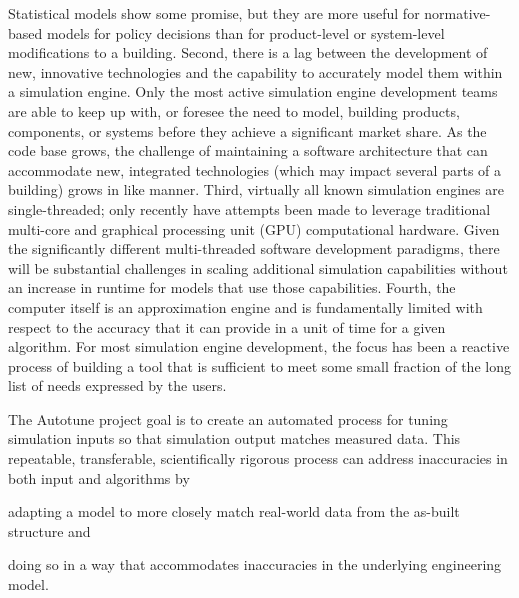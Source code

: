 \documentclass[preprint, review, 12pt]{elsarticle}
\begin{document}
Statistical models show some promise, but they are more useful for normative-based models for policy decisions than for product-level or system-level modifications to a building. Second, there is a lag between the development of new, innovative technologies and the capability to accurately model them within a simulation engine. Only the most active simulation engine development teams are able to keep up with, or foresee the need to model, building products, components, or systems before they achieve a significant market share. As the code base grows, the challenge of maintaining a software architecture that can accommodate new, integrated technologies (which may impact several parts of a building) grows in like manner. Third, virtually all known simulation engines are single-threaded; only recently have attempts been made to leverage traditional multi-core and graphical processing unit (GPU) computational hardware. Given the significantly different multi-threaded software development paradigms, there will be substantial challenges in scaling additional simulation capabilities without an increase in runtime for models that use those capabilities. Fourth, the computer itself is an approximation engine and is fundamentally limited with respect to the accuracy that it can provide in a unit of time for a given algorithm. For most simulation engine development, the focus has been a reactive process of building a tool that is sufficient to meet some small fraction of the long list of needs expressed by the users.

The Autotune project \cite{cit:new2012} goal is to create an automated process for tuning simulation inputs so that simulation output matches measured data. This repeatable, transferable, scientifically rigorous process can address inaccuracies in both input and algorithms by 
\begin{inparaenum}[(1)]
\item adapting a model to more closely match real-world data from the as-built structure and 
\item doing so in a way that accommodates inaccuracies in the underlying engineering
model. %
\end{inparaenum}
\end{document}
